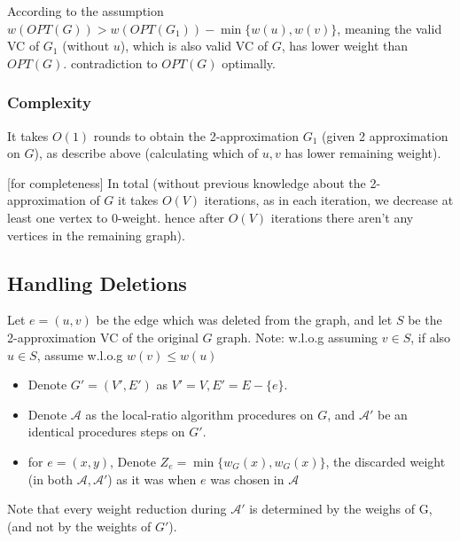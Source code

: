 \documentclass[11pt]{article}
\begin{document}
According to the assumption $w(OPT(G)) > w(OPT({G_1})) - \min\{w(u), w(v)\}$, meaning the valid VC of ${G_1}$ (without $u$), which is also valid VC of $G$, has lower weight than $OPT(G)$. contradiction to $OPT(G)$ optimally.


\subsubsection*{Complexity}
It takes $O(1)$ rounds to obtain the 2-approximation $G_1$ (given 2 approximation on $G$), as describe above (calculating which of $u,v$ has lower remaining weight).

[for completeness]
In total (without previous knowledge about the 2-approximation of $G$ it takes $O(V)$ iterations, as in each iteration, we decrease at least one vertex to 0-weight. hence after $O(V)$ iterations there aren't any vertices in the remaining graph).

\newpage
\subsection{Handling Deletions}
Let $e=(u,v)$ be the edge which was deleted from the graph, and let $S$ be the 2-approximation VC of the original $G$ graph.
Note: w.l.o.g assuming $v \in S$, if also $u \in S$, assume w.l.o.g $w(v) \le w(u)$

\begin{itemize}
    \item Denote $G'=(V',E')$ as $V'=V, E'=E-\{e\}$.
    \item Denote $\mathcal{A}$ as the local-ratio algorithm procedures on $G$, and $\mathcal{A'}$ be an identical procedures steps on $G'$.
    \item for $e=(x,y)$, Denote $Z_e=\min\{w_G(x), w_G(x)\}$, the discarded weight (in both $\mathcal{A, A'}$) as it was when $e$ was chosen in $\mathcal{A}$
\end{itemize}
Note that every weight reduction during $\mathcal{A'}$ is determined by the weighs of G, (and not by the weights of $G'$).
\end{document}
